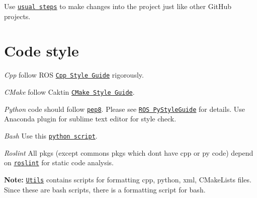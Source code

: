 Use \href{https://akrabat.com/the-beginners-guide-to-contributing-to-a-github-project/}{\tt usual steps} to make changes into the project just like other Git\+Hub projects.\hypertarget{md_coding_docs_coding_guidelines_autotoc_md0}{}\section{Code style}\label{md_coding_docs_coding_guidelines_autotoc_md0}

\begin{DoxyItemize}
\item {\itshape Cpp} follow R\+OS \href{http://wiki.ros.org/CppStyleGuide}{\tt Cpp Style Guide} rigorously.
\item {\itshape C\+Make} follow Caktin \href{http://docs.ros.org/jade/api/catkin/html/user_guide/standards.html}{\tt C\+Make Style Guide}.
\item {\itshape Python} code should follow \href{http://www.python.org/dev/peps/pep-0008/}{\tt pep8}. Please see \href{http://wiki.ros.org/PyStyleGuide}{\tt R\+OS Py\+Style\+Guide} for details. Use {\ttfamily Anaconda} plugin for sublime text editor for style check.
\item {\itshape Bash} Use this \href{http://arachnoid.com/python/beautify_bash_program.html}{\tt python script}.
\item {\itshape Roslint} All pkgs (except {\ttfamily commons} pkgs which don\textquotesingle{}t have cpp or py code) depend on \href{http://wiki.ros.org/roslint}{\tt roslint} for static code analysis.
\end{DoxyItemize}

{\bfseries Note\+:} \href{https://github.com/AUV-IITK/auv2017/tree/master/utils}{\tt Utils} contains scripts for formatting {\ttfamily cpp}, {\ttfamily python}, {\ttfamily xml}, {\ttfamily C\+Make\+Lists} files. Since these are bash scripts, there is a formatting script for {\ttfamily bash}.



